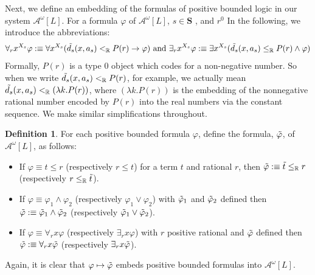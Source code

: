 \documentclass[11pt]{amsart}
\theoremstyle{definition}
\newtheorem{definition}[theorem]{Definition}
\theoremstyle{remark}
\def\RR{\mathbb{R}}
\begin{document}
Next, we define an embedding of the formulas of positive bounded logic in our system $\mathcal{A}^\omega[L]$. For a formula $\varphi$ of $\mathcal{A}^\omega[L]$, $s \in \mathbf{S}$ , and $r^0$ In the following, we introduce the abbreviations:
\[ 
\forall_rx^{X_s}\varphi:\equiv \forall x^{X_s}(\Tilde{d_s}(x,a_s)<_\RR P(r) \to \varphi ) \mbox{ and } \exists_rx^{X_s}\varphi:\equiv \exists x^{X_s}(\Tilde{d_s}(x,a_s)\le_\RR P(r) \land \varphi)
\]
Formally, $P(r)$ is a type 0 object which codes for a non-negative number. So when we write $\Tilde{d_s}(x,a_s)<_\RR P(r)$, for example, we actually mean $\Tilde{d_s}(x,a_s)<_\RR (\lambda k. P(r))$, where $(\lambda k. P(r))$ is the embedding of the nonnegative rational number encoded by $P(r)$  into the real numbers via the constant sequence. We make similar simplifications throughout.
\begin{definition}
    For each positive bounded formula $\varphi$, define the formula, $\Tilde{\varphi}$, of $\mathcal{A}^\omega[L]$, as follows:
       \begin{itemize}
    \item If $\varphi \equiv t\le r$ (respectively $r \le t$) for a term $t$ and rational $r$, then  $\Tilde{\varphi}:\equiv \Tilde{t}\le_\RR r$ (respectively $r \le_\RR \Tilde{t}$). 
    \item If $\varphi \equiv \varphi_1 \land \varphi_2$ (respectively $\varphi_1 \lor \varphi_2$) with $\Tilde{\varphi}_1$ and $\Tilde{\varphi}_2$ defined then  $\Tilde{\varphi}:\equiv \Tilde{\varphi}_1 \land\Tilde{\varphi}_2$ (respectively $\Tilde{\varphi}_1 \lor\Tilde{\varphi}_2$).
    \item If $\varphi \equiv \forall_r x \varphi$ (respectively $\exists_r x \varphi$) with $r$ positive rational and $\Tilde{\varphi}$  defined then  $\Tilde{\varphi}:\equiv \forall_r x \Tilde{\varphi}$ (respectively $\exists_r x \Tilde{\varphi}$). 
    \end{itemize}
\end{definition}
Again, it is clear that $\varphi \mapsto \Tilde{\varphi}$ embeds positive bounded formulas into $\mathcal{A}^\omega[L]$.
\end{document}
